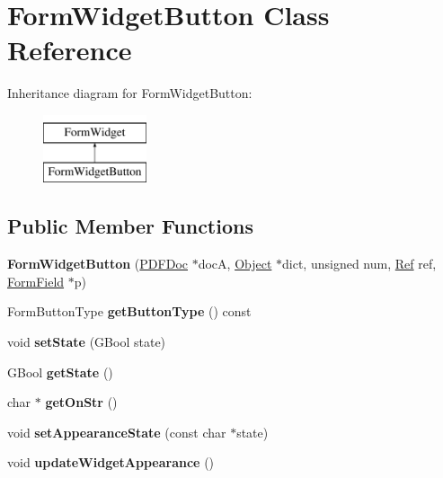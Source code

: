 \hypertarget{class_form_widget_button}{}\section{Form\+Widget\+Button Class Reference}
\label{class_form_widget_button}
Inheritance diagram for Form\+Widget\+Button\+:\begin{figure}[H]
\begin{center}
\leavevmode
\includegraphics[height=2.000000cm]{class_form_widget_button}
\end{center}
\end{figure}
\subsection*{Public Member Functions}
\begin{DoxyCompactItemize}
\item 
\mbox{\label{class_form_widget_button_ac7c304bfa29627803d0a8230145d40cd}} 
{\bfseries Form\+Widget\+Button} (\hyperlink{class_p_d_f_doc}{P\+D\+F\+Doc} $\ast$docA, \hyperlink{class_object}{Object} $\ast$dict, unsigned num, \hyperlink{struct_ref}{Ref} ref, \hyperlink{class_form_field}{Form\+Field} $\ast$p)
\item 
\mbox{\label{class_form_widget_button_a2ad410c7f030d7c318d6af00241d8a82}} 
Form\+Button\+Type {\bfseries get\+Button\+Type} () const
\item 
\mbox{\label{class_form_widget_button_a2cc568f30d95a02afb312c8708bb7de4}} 
void {\bfseries set\+State} (G\+Bool state)
\item 
\mbox{\label{class_form_widget_button_ae8b8d553479d54b326402c4a73b2684d}} 
G\+Bool {\bfseries get\+State} ()
\item 
\mbox{\label{class_form_widget_button_aa405b7431dd345ffd9829989ae91fb89}} 
char $\ast$ {\bfseries get\+On\+Str} ()
\item 
\mbox{\label{class_form_widget_button_aed1ead4871266a08ca5113112544ad35}} 
void {\bfseries set\+Appearance\+State} (const char $\ast$state)
\item 
\mbox{\label{class_form_widget_button_aa30b1f18598ae4e5c19dbfc44490df1b}} 
void {\bfseries update\+Widget\+Appearance} ()
\end{DoxyCompactItemize}
